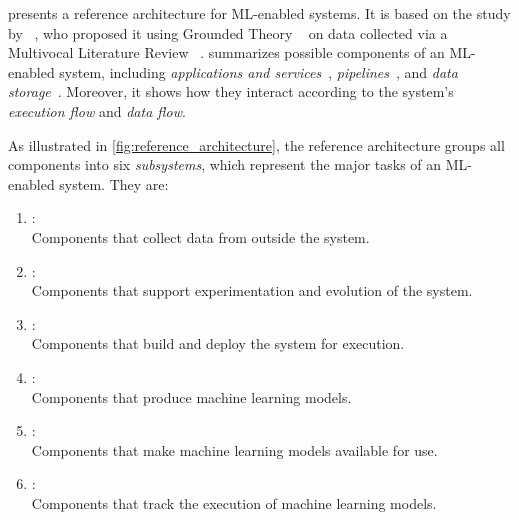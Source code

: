  presents a reference architecture for ML-enabled
systems. It is based on the study by \citeauthor{Kumara2023ArchitectingPractice}%
~\parencite{Kumara2023ArchitectingPractice},
  who proposed it using Grounded Theory%
  ~\parencite{Wohlin2012ExperimentationEngineering}
  on data collected via a Multivocal Literature Review%
  ~\parencite{Garousi2019GuidelinesEngineering}.
 summarizes possible components of
an ML-enabled system, including
  \emph{applications and services}~\parencite{
    Newman2015BuildingMicroservices, %
    Richardson2018MicroservicesPatterns, %
  },
  \emph{pipelines}~\parencite{
    Humble2010ContinuousAutomation, %
    Huyen2022DesigningApplications, %
    Richards2020FundamentalsApproach, %
    Sato2019ContinuousLearning, %
  }, and
  \emph{data storage}~\parencite{
    Kleppmann2017DesigningSystems, %
    Lakshmanan2020MachineMLOps, %
    Reis2022FundamentalsSystems, %
    Sadalage2012NoSQLPersistence, %
  }.
Moreover, it shows how they interact according to the system's
\emph{execution flow} and \emph{data flow}.

As illustrated in \cref{fig:reference_architecture}, the reference
architecture groups all components into six \emph{subsystems}, which
represent the major tasks of an ML-enabled system. They are:
\begin{enumerate}
  \item {}: \\
        Components that collect data from outside the system.
  \item {}: \\
        Components that support experimentation and evolution of the system.
  \item {}: \\
        Components that build and deploy the system for execution.
  \item {}: \\
        Components that produce machine learning models.
  \item {}: \\
        Components that make machine learning models available for use.
  \item {}: \\
        Components that track the execution of machine learning models.
\end{enumerate}

